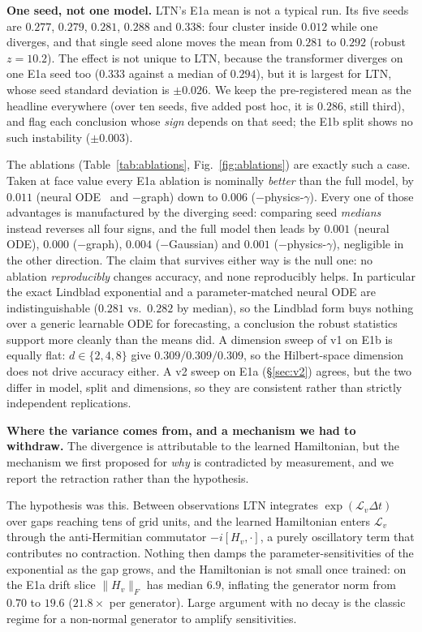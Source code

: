 \documentclass[journal]{IEEEtran}
\begin{document}
\textbf{One seed, not one model.} LTN's E1a mean is not a typical run. Its five
seeds are $0.277$, $0.279$, $0.281$, $0.288$ and $0.338$: four cluster inside
$0.012$ while one diverges, and that single seed alone moves the mean from $0.281$
to $0.292$ (robust $z = 10.2$). The effect is not unique to LTN, because the transformer
diverges on one E1a seed too ($0.333$ against a median of $0.294$), but it is
largest for LTN, whose seed standard deviation is $\pm0.026$. We keep the
pre-registered mean as the headline everywhere (over ten seeds, five added post hoc,
it is $0.286$, still third), and flag each conclusion whose \emph{sign} depends on
that seed; the E1b split shows no such instability
($\pm0.003$).

The ablations (Table~\ref{tab:ablations}, Fig.~\ref{fig:ablations}) are exactly
such a case. Taken at face value every E1a ablation is nominally \emph{better} than
the full model, by $0.011$ (neural ODE~\cite{neuralode2018} and $-$graph) down to
$0.006$ ($-$physics-$\gamma$). Every one of those advantages is manufactured by the
diverging seed: comparing seed \emph{medians} instead reverses all four signs, and
the full model then leads by $0.001$ (neural ODE), $0.000$ ($-$graph), $0.004$
($-$Gaussian) and $0.001$ ($-$physics-$\gamma$), negligible in the other
direction. The claim that survives either way is the null one: no ablation
\emph{reproducibly} changes accuracy, and none reproducibly helps. In particular
the exact Lindblad exponential and a parameter-matched neural ODE are
indistinguishable ($0.281$ vs.\ $0.282$ by median), so the Lindblad form buys
nothing over a generic learnable ODE for forecasting, a conclusion the robust
statistics support more cleanly than the means did. A dimension sweep of v1 on E1b
is equally flat: $d\in\{2,4,8\}$ give $0.309/0.309/0.309$, so the Hilbert-space
dimension does not drive accuracy either. A v2 sweep on E1a (\S\ref{sec:v2}) agrees, but
the two differ in model, split and dimensions, so they are consistent rather than
strictly independent replications.

\textbf{Where the variance comes from, and a mechanism we had to withdraw.} The
divergence is attributable to the learned Hamiltonian, but the mechanism we first
proposed for \emph{why} is contradicted by measurement, and we report the retraction
rather than the hypothesis.

The hypothesis was this. Between observations LTN integrates
$\exp(\mathcal{L}_v \Delta t)$ over gaps reaching tens of grid units, and the learned
Hamiltonian enters $\mathcal{L}_v$ through the anti-Hermitian commutator
$-i[H_v,\cdot]$, a purely oscillatory term that contributes no contraction. Nothing
then damps the parameter-sensitivities of the exponential as the gap grows, and the
Hamiltonian is not small once trained: on the E1a drift slice $\|H_v\|_F$ has median
$6.9$, inflating the generator norm from $0.70$ to $19.6$ ($21.8\times$ per
generator). Large argument with no decay is the classic regime for a non-normal
generator to amplify sensitivities.
\end{document}
